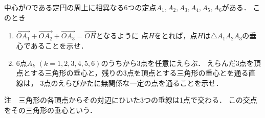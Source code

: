 \documentclass[../../main.tex]{subfiles}
\begin{document}
中心が$O$である定円の周上に相異なる6つの定点$A_1,A_2,A_3,A_4,A_5,A_6$がある．
このとき
\begin{enumerate}
  \item $\overrightarrow{OA_1}+\overrightarrow{OA_2}+\overrightarrow{OA_3}=\overrightarrow{OH}$となるように
    点$H$をとれば，点$H$は$\triangle A_1A_2A_3$の垂心であることを示せ．
  \item 6点$A_k$ $(k=1,2,3,4,5,6)$のうちから3点を任意にえらぶ．
    えらんだ3点を頂点とする三角形の垂心と，残りの3点を頂点とする三角形の重心とを通る直線は，
    3点のえらびかたに無関係な一定の点を通ることを示せ．
\end{enumerate}
注　三角形の各頂点からその対辺にひいた3つの垂線は1点で交わる．
この交点をその三角形の垂心という．
\end{document}
